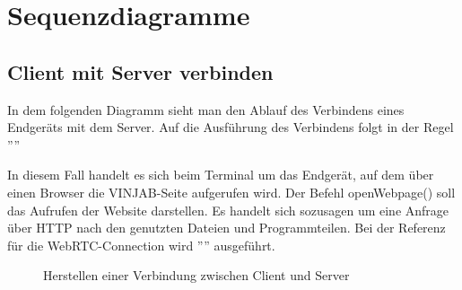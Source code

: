 \documentclass[entwurf.tex]{subfiles}
\begin{document}
\chapter{Sequenzdiagramme}
	\section{Client mit Server verbinden}
	\label{Sequence:TerminalConnect}
		In dem folgenden Diagramm sieht man den Ablauf des Verbindens eines Endgeräts mit dem Server. Auf die Ausführung des Verbindens folgt in der Regel ''''
		
		In diesem Fall handelt es sich beim Terminal um das Endgerät, auf dem über einen Browser die VINJAB-Seite aufgerufen wird. Der Befehl openWebpage() soll das Aufrufen der Website darstellen. Es handelt sich sozusagen um eine Anfrage über HTTP nach den genutzten Dateien und Programmteilen. Bei der Referenz für die WebRTC-Connection wird '''' ausgeführt.
		
		\begin{figure}[H]
  			\caption{Herstellen einer Verbindung zwischen Client und Server}
  		\end{figure}
  		
\end{document}
